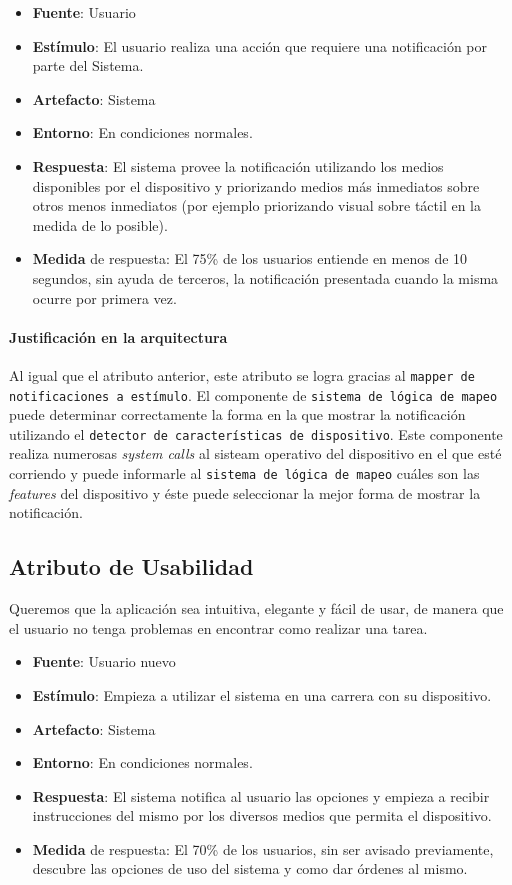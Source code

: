 \begin{itemize}
  \item \textbf{Fuente}: Usuario
  \item \textbf{Estímulo}: El usuario realiza una acción que requiere una notificación por parte del Sistema.
  \item \textbf{Artefacto}: Sistema
  \item \textbf{Entorno}: En condiciones normales.
  \item \textbf{Respuesta}: El sistema provee la notificación utilizando los medios disponibles por el dispositivo y priorizando medios más inmediatos sobre otros menos inmediatos (por ejemplo priorizando visual sobre táctil en la medida de lo posible).
  \item \textbf{Medida} de respuesta: El 75\% de los usuarios entiende en menos de 10 segundos, sin ayuda de terceros, la notificación presentada cuando la misma ocurre por primera vez.
\end{itemize}

\paragraph{Justificación en la arquitectura}
Al igual que el atributo anterior, este atributo se logra gracias al \texttt{mapper de notificaciones a estímulo}. El componente de \texttt{sistema de lógica de mapeo} puede determinar correctamente la forma en la que mostrar la notificación utilizando el \texttt{detector de características de dispositivo}. Este componente realiza numerosas \emph{system calls} al sisteam operativo del dispositivo en el que esté corriendo y puede informarle al \texttt{sistema de lógica de mapeo} cuáles son las \emph{features} del dispositivo y éste puede seleccionar la mejor forma de mostrar la notificación. 

\subsection{Atributo de Usabilidad}
Queremos que la aplicación sea intuitiva, elegante y fácil de usar, de manera que el usuario no tenga problemas en encontrar como realizar una tarea.

\begin{itemize}
  \item \textbf{Fuente}: Usuario nuevo
  \item \textbf{Estímulo}: Empieza a utilizar el sistema en una carrera con su dispositivo.
  \item \textbf{Artefacto}: Sistema
  \item \textbf{Entorno}: En condiciones normales.
  \item \textbf{Respuesta}: El sistema notifica al usuario las opciones y empieza a recibir instrucciones del mismo por los diversos medios que permita el dispositivo.
  \item \textbf{Medida} de respuesta: El 70\% de los usuarios, sin ser avisado previamente, descubre las opciones de uso del sistema y como dar órdenes al mismo.
\end{itemize}

